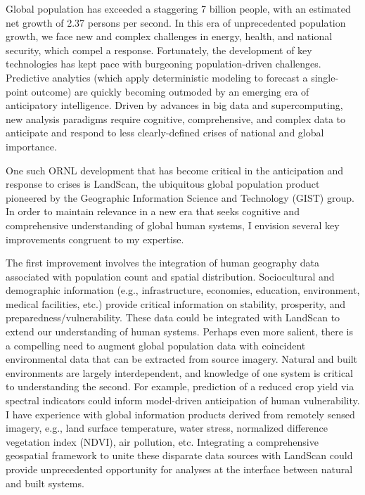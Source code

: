 \documentclass[letterpaper,sans]{moderncv}
\begin{document}
\begin{paracol}{2}
\begin{leftcolumn}
Global population has exceeded a staggering 7 billion people, with an estimated net growth of 2.37 persons per second. In this era of unprecedented population growth, we face new and complex challenges in energy, health, and national security, which compel a response.  
Fortunately, the development of key technologies has kept pace with burgeoning population-driven challenges. Predictive analytics (which apply deterministic modeling to forecast a single-point outcome) are quickly becoming outmoded by an emerging era of anticipatory intelligence. Driven by advances in big data and supercomputing, new analysis paradigms require cognitive, comprehensive, and complex data to anticipate and respond to less clearly-defined crises of national and global importance.
\vspace{.2cm}

One such ORNL development that has become critical in the anticipation and response to crises is LandScan, the ubiquitous global population product pioneered by the Geographic Information Science and Technology (GIST) group. %
In order to maintain relevance in a new era that seeks cognitive and comprehensive understanding of global human systems, I envision several key improvements congruent to my expertise.   
\vspace{.2cm}

The first improvement involves the integration of human geography data associated with population count and spatial distribution. Sociocultural and demographic information (e.g., infrastructure, economies, education, environment, medical facilities, etc.) provide critical information on stability, prosperity, and preparedness/vulnerability. These data could be integrated with LandScan to extend our understanding of human systems. %
Perhaps even more salient, there is a compelling need to augment global population data with coincident environmental data that can be extracted from source imagery.  Natural and built environments are largely interdependent, and knowledge of one system is critical to understanding the second. For example, prediction of a reduced crop yield via spectral indicators could inform model-driven anticipation of human vulnerability. I have experience with global information products derived from remotely sensed imagery, e.g., land surface temperature, water stress, normalized difference vegetation index (NDVI), air pollution, etc. Integrating a comprehensive geospatial framework to unite these disparate data sources with LandScan could provide unprecedented opportunity for analyses at the interface between natural and built systems.
\vspace{.2cm}


\end{leftcolumn}
\end{paracol}
\end{document}
